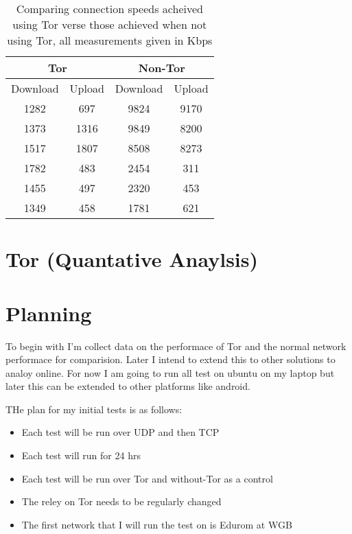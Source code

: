 \documentclass[12pt,a4paper,oneside]{article}
\begin{document}
\begin{table}[tbp]
\centering
\begin{tabular}{|c c|c c|}
	\hline
	\multicolumn{2}{|c|}{Tor} & \multicolumn{2}{|c|}{Non-Tor} \\
	\hline
	Download & Upload & Download & Upload \\
	\hline
	1282 & 697 & 9824 & 9170 \\
	1373 & 1316 & 9849 & 8200 \\
	1517 & 1807 & 8508 & 8273 \\
	\hline
	1782 & 483 & 2454 & 311 \\
	1455 & 497 & 2320 & 453 \\
	1349 & 458 & 1781 & 621 \\
	\hline
	
	

\end{tabular}
\caption{Comparing connection speeds acheived using Tor verse those achieved when not using Tor, all measurements given in Kbps}
\label{tab:my table on Tor connection speeds}
\end{table}



\section{Tor (Quantative Anaylsis)}

\section{Planning}
To begin with I'm collect data on the performace of Tor and the normal network performace for comparision. Later I intend to extend this to other solutions to analoy online. For now I am going to run all test on ubuntu on my laptop but later this can be extended to other platforms like android. 

THe plan for my initial tests is as follows:
\begin{itemize}
\item Each test will be run over UDP and then TCP
\item Each test will run for 24 hrs 
\item Each test will be run over Tor and without-Tor as a control
\item The reley on Tor needs to be regularly changed
\item The first network that I will run the test on is Edurom at WGB

\end{itemize}
\end{document}
